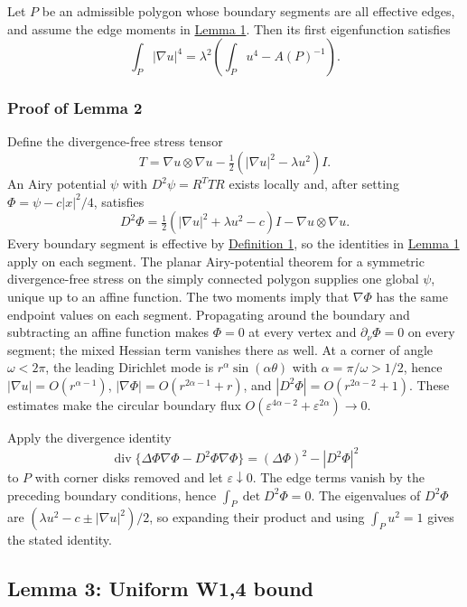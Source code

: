 \documentclass[11pt]{article}
\begin{document}
Let \(P\) be an admissible polygon whose boundary segments are all
effective edges, and assume the edge moments in
\hyperref[lem-edge-moments]{Lemma 1}. Then its first eigenfunction
satisfies \[
\int_P|\nabla u|^4=\lambda^2\left(\int_Pu^4-A(P)^{-1}\right).
\]

\subsubsection{Proof of Lemma 2}\label{proof-lem-airy-identity}

Define the divergence-free stress tensor \[
T=\nabla u\otimes\nabla u-\tfrac12(|\nabla u|^2-\lambda u^2)I.
\] An Airy potential \(\psi\) with \(D^2\psi=R^TTR\) exists locally and,
after setting \(\Phi=\psi-c|x|^2/4\), satisfies \[
D^2\Phi=\tfrac12(|\nabla u|^2+\lambda u^2-c)I-\nabla u\otimes\nabla u.
\] Every boundary segment is effective by
\hyperref[def-admissible-polygon]{Definition 1}, so the identities in
\hyperref[lem-edge-moments]{Lemma 1} apply on each segment. The planar
Airy-potential theorem for a symmetric divergence-free stress on the
simply connected polygon supplies one global \(\psi\), unique up to an
affine function. The two moments imply that \(\nabla\Phi\) has the same
endpoint values on each segment. Propagating around the boundary and
subtracting an affine function makes \(\Phi=0\) at every vertex and
\(\partial_\nu\Phi=0\) on every segment; the mixed Hessian term vanishes
there as well. At a corner of angle \(\omega<2\pi\), the leading
Dirichlet mode is \(r^\alpha\sin(\alpha\theta)\) with
\(\alpha=\pi/\omega>1/2\), hence \(|\nabla u|=O(r^{\alpha-1})\),
\(|\nabla\Phi|=O(r^{2\alpha-1}+r)\), and
\(|D^2\Phi|=O(r^{2\alpha-2}+1)\). These estimates make the circular
boundary flux \(O(\varepsilon^{4\alpha-2}+\varepsilon^{2\alpha})\to0\).

Apply the divergence identity \[
\operatorname{div}\{\Delta\Phi\nabla\Phi-D^2\Phi\nabla\Phi\}=(\Delta\Phi)^2-|D^2\Phi|^2
\] to \(P\) with corner disks removed and let
\(\varepsilon\downarrow0\). The edge terms vanish by the preceding
boundary conditions, hence \(\int_P\det D^2\Phi=0\). The eigenvalues of
\(D^2\Phi\) are \((\lambda u^2-c\pm|\nabla u|^2)/2\), so expanding their
product and using \(\int_Pu^2=1\) gives the stated identity.

\subsection{Lemma 3: Uniform W1,4 bound}\label{lem-uniform-w14}
\end{document}
